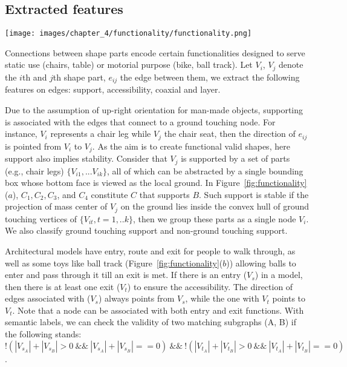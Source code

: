 \subsection{Extracted features}

\begin{figure*}[t!]
	\centering
		\texttt{[image: images/chapter\_4/functionality/functionality.png]}\\
	\caption[Functionality.]{Functionality. (a) shape part C supports B; (b) A ball track model has an entry and an exit, and layers can be counted starting from ground touching nodes; (c) B and C share the common axis $S_2$. }
	\label{fig:functionality}
\end{figure*}

Connections between shape parts encode certain functionalities designed to serve static use (chairs, table) or motorial purpose (bike, ball track). Let $V_i$, $V_j$ denote the $i$th and $j$th shape part, $e_{ij}$ the edge between them, we extract the following features on edges: support, accessibility, coaxial and layer.

 Due to the assumption of up-right orientation for man-made objects, supporting is associated with the edges that connect to a ground touching node. For instance, $V_i$ represents a chair leg while $V_j$ the chair seat, then the direction of $e_{ij}$ is pointed from $V_i$ to $V_j$. As the aim is to create functional valid shapes, here support also implies stability. Consider that $V_j$ is supported by a set of parts (e.g., chair legs) $\{V_{i1}, ... V_{ik}\}$, all of which can be abstracted by a single bounding box whose bottom face is viewed as the local ground. In Figure~\ref{fig:functionality}($a$), $C_1, C_2, C_3$, and $C_4$ constitute $C$ that supports $B$. Such support is stable if the projection of mass center of $V_j$ on the ground lies inside the convex hull of ground touching vertices of $\{V_{it}, t = 1,..k\}$, then we group these parts as a single node $V_i$. We also classify ground touching support and non-ground touching support.

 Architectural models have entry, route and exit for people to walk through, as well as some toys like ball track (Figure~\ref{fig:functionality}($b$)) allowing balls to enter and pass through it till an exit is met. If there is an entry ($V_s$) in a model, then there is at least one exit ($V_t$) to ensure the accessibility. The direction of edges associated with ($V_s$) always points from $V_s$, while the one with $V_t$ points to $V_t$. Note that a node can be associated with both entry and exit functions. With semantic labels, we can check the validity of two matching subgraphs (A, B) if the following stands:
$!(|V_{s_A}| + |V_{s_B}| > 0\ \&\&\ |V_{s_A}| + |V_{s_B}| == 0)\ \&\&\ !(|V_{t_A}| + |V_{t_B}| > 0\ \&\&\ |V_{t_A}| + |V_{t_B}| == 0)$.


